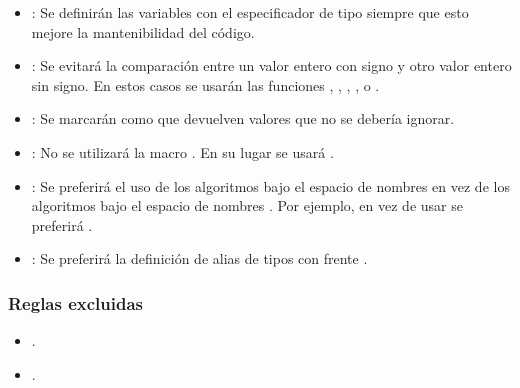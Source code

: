 \begin{itemize}
\item {}:
Se definirán las variables con el especificador de tipo  siempre
que esto mejore la mantenibilidad del código.

\item {}:
Se evitará la comparación entre un valor entero con signo y otro valor entero
sin signo. En estos casos se usarán las funciones ,
, , ,
 o .

\item {}:
Se marcarán como \cppkey{[[nodiscard]]} que devuelven valores que no se debería
ignorar.

\item {}:
No se utilizará la macro .
En su lugar se usará .

\item {}:
Se preferirá el uso de los algoritmos bajo el espacio de nombres
 en vez de los algoritmos bajo el espacio de nombres
. Por ejemplo, en vez de usar 
se preferirá .

\item {}:
Se preferirá la definición de alias de tipos con  frente
.

\end{itemize}

\subsubsection{Reglas excluidas}

\begin{itemize}

\item {}.
\item {}.

\end{itemize}

